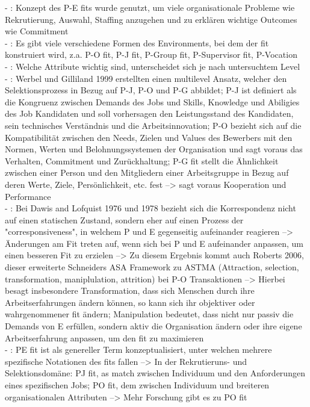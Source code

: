 - \cite[S. 5]{su:2015}: Konzept des P-E fits wurde genutzt, um viele organisationale Probleme wie Rekrutierung, Auswahl, Staffing anzugehen und zu erklären wichtige Outcomes wie Commitment \\
- \cite[S. 5]{su:2015}: Es gibt viele verschiedene Formen des Environments, bei dem der fit konstruiert wird, z.a. P-O fit, P-J fit, P-Group fit, P-Supervisor fit, P-Vocation \\
- \cite[S. 5]{su:2015}: Welche Attribute wichtig sind, unterscheidet sich je nach untersuchtem Level \\
- \cite[S. 5]{su:2015}: Werbel und Gilliland 1999 erstellten einen multilevel Ansatz, welcher den Selektionsprozess in Bezug auf P-J, P-O und P-G abbildet; P-J ist definiert als die Kongruenz zwischen Demands des Jobs und Skills, Knowledge und Abiligies des Job Kandidaten und soll vorhersagen den Leistungsstand des Kandidaten, sein technisches Verständnis und die Arbeitsinnovation; P-O bezieht sich auf die Kompatibilität zwischen den Needs, Zielen und Values des Bewerbers mit den Normen, Werten und Belohnungssystemen der Organisation und sagt voraus das Verhalten, Commitment und Zurückhaltung; P-G fit stellt die Ähnlichkeit zwischen einer Person und den Mitgliedern einer Arbeitsgruppe in Bezug auf deren Werte, Ziele, Persönlichkeit, etc. fest --> sagt voraus Kooperation und Performance \\
- \cite[S. 11f.]{su:2015}: Bei Dawis and Lofquist 1976 und 1978 bezieht sich die Korrespondenz nicht auf einen statischen Zustand, sondern eher auf einen Prozess der "corresponsiveness", in welchem P und E gegenseitig aufeinander reagieren --> Änderungen am Fit treten auf, wenn sich bei P und E aufeinander anpassen, um einen besseren Fit zu erzielen --> Zu diesem Ergebnis kommt auch Roberts 2006, dieser erweiterte Schneiders ASA Framework zu ASTMA (Attraction, selection, transformation, maniplulation, attrition) bei P-O Transaktionen --> Hierbei besagt insbesondere Transformation, dass sich Menschen durch ihre Arbeitserfahrungen ändern können, so kann sich ihr objektiver oder wahrgenommener fit ändern; Manipulation bedeutet, dass nicht nur passiv die Demands von E erfüllen, sondern aktiv die Organisation ändern oder ihre eigene Arbeitserfahrung anpassen, um den fit zu maximieren \\
- \cite[S. 1f.]{carless:2005}: PE fit ist als genereller Term konzeptualisiert, unter welchen mehrere spezifische Notationen des fits fallen --> In der Rekrutieruns- und Selektionsdomäne: PJ fit, as match zwischen Individuum und den Anforderungen eines spezifischen Jobs; PO fit, dem zwischen Individuum und breiteren organisationalen Attributen --> Mehr Forschung gibt es zu PO fit \\
